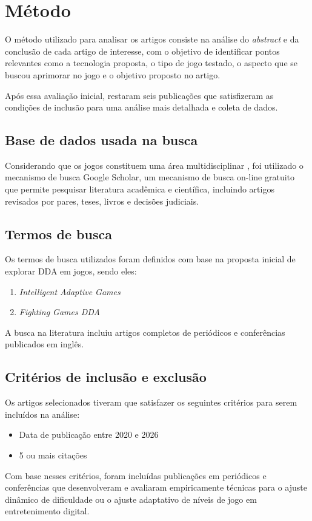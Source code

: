 \section{Método} \label{sec:method}
    O método utilizado para analisar os artigos consiste na 
    análise do \textit{abstract} e da conclusão de cada 
    artigo de interesse, com o objetivo de identificar 
    pontos relevantes como a tecnologia proposta, o tipo
    de jogo testado, o aspecto que se buscou aprimorar 
    no jogo e o objetivo proposto no artigo.

    Após essa avaliação inicial, restaram seis 
    publicações que satisfizeram as condições de 
    inclusão para uma análise mais detalhada e coleta de
    dados.


\subsection{Base de dados usada na busca}
    Considerando que os jogos constituem uma área 
    multidisciplinar \cite{mortazavi2024dynamic}, 
    foi utilizado o mecanismo de busca Google Scholar,
    um mecanismo de busca on-line gratuito que permite 
    pesquisar literatura acadêmica e científica, 
    incluindo artigos revisados por pares, teses, 
    livros e decisões judiciais.


\subsection{Termos de busca}
    Os termos de busca utilizados foram definidos 
    com base na proposta inicial de explorar DDA 
    em jogos, sendo eles:

    \begin{enumerate}
        \item \textit{Intelligent Adaptive Games}
        \item \textit{Fighting Games DDA}
    \end{enumerate}

    A busca na literatura incluiu artigos completos de 
    periódicos e conferências publicados em inglês.


\subsection{Critérios de inclusão e exclusão}
    Os artigos selecionados tiveram que satisfazer os 
    seguintes critérios para serem incluídos na análise:

    \begin{itemize}
        \item Data de publicação entre 2020 e 2026 
        \item 5 ou mais citações
    \end{itemize}

    Com base nesses critérios, foram incluídas publicações
    em periódicos e conferências que desenvolveram e 
    avaliaram empiricamente técnicas para o ajuste 
    dinâmico de dificuldade ou o ajuste adaptativo de 
    níveis de jogo em entretenimento digital.

